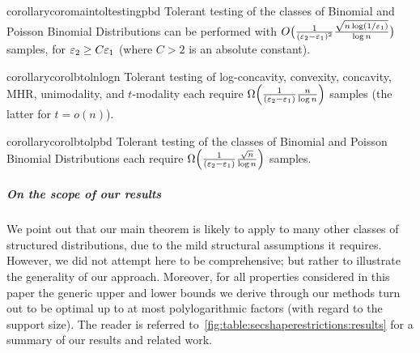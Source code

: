 \begin{restatable}{corollary}{coromaintoltestingpbd}\label{coro:main:tol:testing:pbd}
Tolerant testing of the classes of Binomial and Poisson Binomial Distributions can be performed with $O\big( \frac{1}{(\varepsilon_2-\varepsilon_1)^2}\frac{\sqrt{n\log({1}/{\varepsilon_1})}}{\log n} \big)$ samples, for $\varepsilon_2 \geq C \varepsilon_1$ (where $C>2$ is an absolute constant).
\end{restatable}

\begin{restatable}{corollary}{corolbtolnlogn}\label{coro:tol:lb:nlogn}
  Tolerant testing of log-concavity, convexity, concavity, MHR, unimodality, and $t$-modality each require $\bigOmega{\frac{1}{(\eps_2-\eps_1)}\frac{n}{\log n}}$ samples (the latter for $t = o(n)$).
\end{restatable}

\begin{restatable}{corollary}{corolbtolpbd}\label{coro:lb:tol:pbd}
  Tolerant testing of the classes of Binomial and Poisson Binomial Distributions each require $\bigOmega{\frac{1}{(\eps_2-\eps_1)}\frac{\sqrt{n}}{\log n}}$ samples.
\end{restatable}

\subparagraph{On the scope of our results} We point out that our main theorem is likely to apply to many other classes of structured distributions, 
due to the mild structural assumptions it requires. However, we did not attempt here to be comprehensive; but rather to illustrate the generality of our approach. Moreover, for all properties considered in this paper the generic upper and lower bounds we derive through our methods turn out to be optimal up to at most polylogarithmic factors (with regard to the support size). The reader is referred to~\cref{fig:table:secshaperestrictions:results} for a summary of our results and related work.

